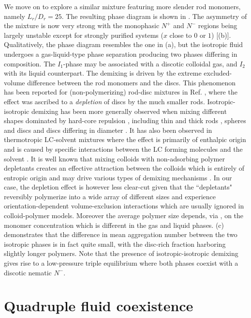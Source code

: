 We move on to explore a similar mixture featuring more slender rod monomers, namely $L_{r}/D_{r} = 25$. The resulting phase diagram is shown in . The asymmetry of the mixture is now very strong with the monophasic  $N^{+}$ and $N^{-}$ regions being largely unstable except for strongly purified systems  ($x$ close to $0$ or $1$)  [(b)]. Qualitatively, the phase diagram resembles the one in (a), but the isotropic fluid  undergoes a gas-liquid-type phase separation producing two phases differing in composition. The $I_{1}$-phase may be associated with a discotic colloidal gas, and  $I_{2}$  with its liquid counterpart.   The demixing is driven by the extreme excluded-volume difference between the rod monomers and the discs. This phenomenon has been reported for (non-polymerizing) rod-disc mixtures in Ref. \cite{varga2002}, where the effect was ascribed to a {\em depletion} of discs by the much smaller rods. Isotropic-isotropic demixing has  been more generally observed when mixing different shapes dominated by hard-core repulsion \cite{dijkstra1994}, including thin and thick rods \cite{vanRoij97}, spheres and discs   \cite{chen2015,aliabadi2016} and discs  differing in diameter \cite{phillips_pre2010}. It has also been observed in thermotropic LC-solvent mixtures where the effect is primarily of enthalpic origin and is caused by specific interactions between the LC forming molecules and the solvent \cite{matsuyama1996,reyes2019}.  It is well known that mixing colloids with non-adsorbing polymer depletants creates an effective attraction between the colloids which is entirely of entropic origin and may drive various types of demixing mechanisms \cite{LekkerkerkerTuinier2011}. In our case, the depletion effect is however less clear-cut given that the ``depletants"   reversibly polymerize into a wide array of different sizes \cite{peters2021} and experience  orientation-dependent volume-exclusion interactions which are usually ignored in colloid-polymer models. Moreover the average polymer size depends, via , on the monomer concentration which is different in the gas and liquid phases. (c) demonstrates that the difference in mean aggregation number between the two isotropic phases is in fact quite small, with the disc-rich fraction harboring slightly longer polymers.   Note that the presence of isotropic-isotropic demixing gives rise to a low-pressure triple equilibrium where both phases coexist with a discotic nematic $N^{-}$.  

\section{Quadruple fluid coexistence}

